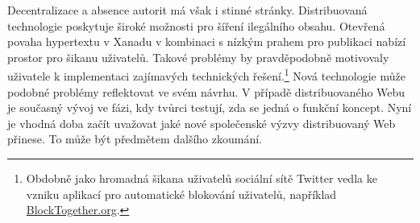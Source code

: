 Decentralizace a absence autorit má však i stinné stránky. Distribuovaná technologie poskytuje široké možnosti pro šíření ilegálního obsahu. Otevřená povaha hypertextu v Xanadu v kombinaci s nízkým prahem pro publikaci nabízí prostor pro šikanu uživatelů. Takové problémy by pravděpodobně motivovaly uživatele k implementaci zajímavých technických řešení.\footnote{Obdobně jako hromadná šikana uživatelů sociální sítě Twitter vedla ke vzniku aplikací pro automatické blokování uživatelů, například \href{https://blocktogether.org/}{BlockTogether.org}.}
Nová technologie může podobné problémy reflektovat ve svém návrhu. V případě distribuovaného Webu je současný vývoj ve fázi, kdy tvůrci testují, zda se jedná o funkční koncept. Nyní je vhodná doba začít uvažovat jaké nové společenské výzvy distribuovaný Web přinese. To může být předmětem dalšího zkoumání.
